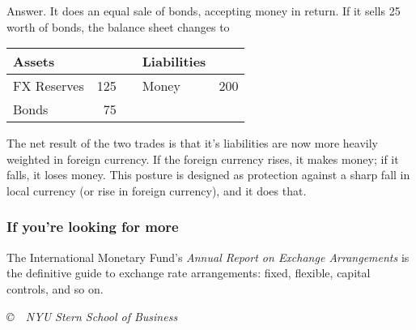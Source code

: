 \documentclass[letterpaper,12pt]{article}
\begin{document}
\begin{enumerate}
Answer.  It does an equal sale of bonds, accepting money in return.
If it sells 25 worth of bonds, the balance sheet changes to
\begin{center}
\begin{tabular}{lrclr}
               Assets  &     &&     Liabilities                     \\
               \hline
               FX Reserves &  125 &&     Money  &  200   \\
               Bonds   & 75 && \\
\end{tabular}
\end{center}
%
The net result of the two trades is that it's liabilities are now more heavily weighted in foreign currency.
If the foreign currency rises, it makes money; if it falls, it loses money.
This posture is designed as protection against a sharp fall in local currency (or rise in foreign currency), and it does that.

\end{enumerate}


\subsubsection*{If you're looking for more}

The International Monetary Fund's
{\it Annual Report on Exchange Arrangements\/}
is the definitive guide to exchange rate arrangements:  fixed,
flexible, capital controls, and so on.


\vfill \centerline{\it \copyright \ \number\year \
NYU Stern School of Business}
\end{document}
